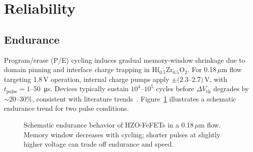 \documentclass[journal]{IEEEtran}
\newcommand{\HZO}{Hf$_{0.5}$Zr$_{0.5}$O$_2$}
\begin{document}
\section{Reliability}

\subsection*{Endurance}
Program/erase (P/E) cycling induces gradual memory-window shrinkage due to domain pinning and interface charge trapping in \HZO{}. For 0.18\,$\mu$m flow targeting 1.8\,V operation, internal charge pumps apply $\pm(2.3$--$2.7)$\,V, with $t_{\mathrm{pulse}}=1$--\SI{50}{\micro\second}. Devices typically sustain $10^4$--$10^5$ cycles before $\Delta V_\mathrm{th}$ degrades by $\sim 20$--$30\%$, consistent with literature trends~\cite{Mueller2015,Park2020}. Figure~\ref{fig:endurance_schem} illustrates a schematic endurance trend for two pulse conditions.

\begin{figure}[t]
\centering
{}
\caption{Schematic endurance behavior of HZO-FeFETs in a 0.18\,$\mu$m flow. Memory window decreases with cycling; shorter pulses at slightly higher voltage can trade off endurance and speed.}
\label{fig:endurance_schem}
\end{figure}
\end{document}
